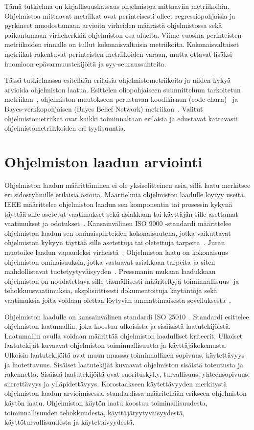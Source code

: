 \documentclass[finnish]{tktltiki2}
\theoremstyle{definition}
\theoremstyle{remark}
\begin{document}
Tämä tutkielma on kirjallisuuskatsaus ohjelmistoa mittaaviin metriikoihin. Ohjelmistoa mittaavat metriikat ovat perinteisesti olleet regressiopohjaisia ja pyrkineet muodostamaan arvioita virheiden määrästä ohjelmistossa sekä paikantamaan virheherkkiä ohjelmiston osa-alueita. Viime vuosina perinteisten metriikoiden rinnalle on tullut kokonaisvaltaisia metriikoita. Kokonaisvaltaiset metriikat rakentuvat perinteisten metriikoiden varaan, mutta ottavat lisäksi huomioon epävarmuustekijöitä ja syy-seuraussuhteita.

Tässä tutkielmassa esitellään erilaisia ohjelmistometriikoita ja niiden kykyä arvioida ohjelmiston laatua. Esittelen oliopohjaiseen suunnitteluun tarkoitetun metriikan~\cite{CK91, CK94}, ohjelmiston muutokseen perustuvan koodikirnun (code churn)~\cite{NB05} ja Bayes-verkkopohjaisen (Bayes Belief Network) metriikan~\cite{FNMHMKM07}. Valitut ohjelmistometriikat ovat kaikki toiminnaltaan erilaisia ja edustavat kattavasti ohjelmistometriikkoiden eri tyylisuuntia.

\newpage

\section{Ohjelmiston laadun arviointi}

Ohjelmiston laadun määrittäminen ei ole yksiselitteinen asia, sillä laatu merkitsee eri sidosryhmille erilaisia asioita. Määritelmiä ohjelmiston laadulle löytyy useita. IEEE määrittelee ohjelmiston laadun sen komponentin tai prosessin kykynä täyttää sille asetetut vaatimukset sekä asiakkaan tai käyttäjän sille asettamat vaatimukset ja odotukset~\cite{IEEE90}. Kansainvälinen ISO 9000 -standardi määrittelee ohjelmiston laadun sen ominaispiirteiden kokonaisuutena, jotka vaikuttavat ohjelmiston kykyyn täyttää sille asetettuja tai oletettuja tarpeita~\cite{ISO9000, MD06}. Juran muotoilee laadun vapaudeksi virheistä~\cite{JGB74}. Ohjelmiston laatu on kokonaisuus ohjelmiston ominaisuuksia, jotka vastaavat asiakkaan tarpeita ja siten mahdollistavat tuotetyytyväisyyden~\cite{JGB74}. Pressmanin mukaan laadukkaan ohjelmiston on noudatettava sille täsmällisesti määriteltyjä toiminnallisuus- ja tehokkuusvaatimuksia, eksplisiittisesti dokumentoituja käytäntöjä sekä vaatimuksia joita voidaan olettaa löytyvän ammattimaisesta sovelluksesta~\cite{PI92}.

Ohjelmiston laadulle on kansainvälinen standardi ISO 25010~\cite{ISO25010}. Standardi esittelee ohjelmiston laatumallin, joka koostuu ulkoisista ja sisäisistä laatutekijöistä. Laatumallin avulla voidaan määrittää ohjelmiston laadulliset kriteerit. Ulkoiset laatutekijät kuvaavat ohjelmiston toiminnallisuutta ja käyttäjäkokemusta. Ulkoisia laatutekijöitä ovat muun muassa toiminnallinen sopivuus, käytettävyys ja luotettavuus. Sisäiset laatutekijät kuvaavat ohjelmiston sisäistä toteutusta ja rakennetta. Sisäisiä laatutekijöitä ovat suorituskyky, turvallisuus, yhteensopivuus, siirrettävyys ja ylläpidettävyys. Korostaakseen käytettävyyden merkitystä ohjelmiston laadun arvioimisessa, standardissa määritellään erikseen ohjelmiston käytön laatu. Ohjelmiston käytön laatu koostuu toiminallisuudesta, toiminnallisuuden tehokkuudesta, käyttäjätyytyväisyydestä, käyttöturvallisuudesta ja käytettävyydestä.
\end{document}
